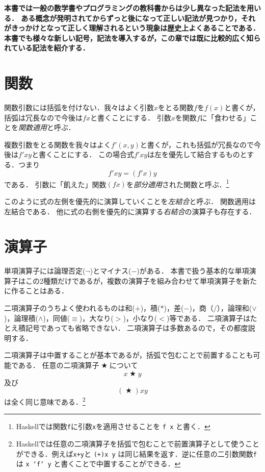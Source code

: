 \documentclass[twocolumn]{jsbook}
\newcommand{\mathAnyBinaryOperator}{\mathop{\bigstar}}
\newcommand{\keyword}[1]{\emph{#1}}
\newcommand{\code}[1]{\texttt{#1}}
\newenvironment{leader}{\begingroup\bf}{\endgroup}
\begin{document}
\begin{leader}
本書では一般の数学書やプログラミングの教科書からは少し異なった記法を用いる．
ある概念が発明されてからずっと後になって正しい記法が見つかり，それがきっかけとなって正しく理解されるという現象は歴史上よくあることである．
本書でも様々な新しい記号，記法を導入するが，この章では既に比較的広く知られている記法を紹介する．
\end{leader}


\section{関数}

関数引数には括弧を付けない．我々はよく引数$x$をとる関数$f$を$f(x)$と書くが，括弧は冗長なので今後は$fx$と書くことにする．
引数$x$を関数$f$に「食わせる」ことを\keyword{関数適用}と呼ぶ．

複数引数をとる関数を我々はよく$f'(x,y)$と書くが，これも括弧が冗長なので今後は$f'xy$と書くことにする．
この場合式$f'xy$は左を優先して結合するものとする．つまり$$f'xy=(f'x)y$$である．
引数に「飢えた」関数$(fx)$を\keyword{部分適用}された関数と呼ぶ．\footnote{Haskellでは関数\code{f}に引数\code{x}を適用させることを \code{f x} と書く．}

このように式の左側を優先的に演算していくことを\keyword{左結合}と呼ぶ．
関数適用は左結合である．
他に式の右側を優先的に演算する\keyword{右結合}の演算子も存在する．

\section{演算子}

単項演算子には論理否定($\neg$)とマイナス($-$)がある．
本書で扱う基本的な単項演算子はこの2種類だけであるが，複数の演算子を組み合わせて単項演算子を新たに作ることはある．

二項演算子のうちよく使われるものは和($+$)，積($*$)，差($-$)，商（$/$），論理和($\vee$)，論理積($\wedge$)，同値($\equiv$)，大なり($>$)，小なり($<$)等である．
二項演算子はたとえ積記号であっても省略できない．
二項演算子は多数あるので，その都度説明する．

二項演算子は中置することが基本であるが，括弧で包むことで前置することも可能である．
任意の二項演算子$\mathAnyBinaryOperator$について$$x\mathAnyBinaryOperator y$$及び$$(\mathAnyBinaryOperator)xy$$は全く同じ意味である．\footnote{Haskellでは任意の二項演算子を括弧で包むことで前置演算子として使うことができる．例えば\code{x+y}と \code{(+)x y} は同じ結果を返す．逆に任意の二引数関数\code{f}は \code{x `f` y} と書くことで中置することができる．}
\end{document}
